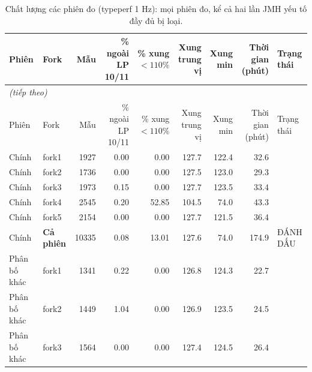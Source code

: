 \footnotesize
\begin{longtable}{llrrrrrrl}
\caption{Chất lượng các phiên đo (typeperf 1 Hz): mọi phiên đo, kể cả hai lần JMH yếu tố đầy đủ bị loại.}\label{tab:session_quality}\\
\toprule
Phiên & Fork & Mẫu & \makecell{{\% ngoài} \\ {LP 10/11}} & \makecell{{\% xung} \\ {$<110\%$}} & \makecell{{Xung} \\ {trung vị}} & \makecell{{Xung} \\ {min}} & \makecell{{Thời gian} \\ {(phút)}} & Trạng thái \\
\midrule
\endfirsthead
\multicolumn{9}{l}{\textit{(tiếp theo)}}\\
\toprule
Phiên & Fork & Mẫu & \makecell{{\% ngoài} \\ {LP 10/11}} & \makecell{{\% xung} \\ {$<110\%$}} & \makecell{{Xung} \\ {trung vị}} & \makecell{{Xung} \\ {min}} & \makecell{{Thời gian} \\ {(phút)}} & Trạng thái \\
\midrule
\endhead
\bottomrule
\endlastfoot
Chính & fork1 & \num{1927} & 0.00 & 0.00 & 127.7 & 122.4 & 32.6 &  \\
Chính & fork2 & \num{1736} & 0.00 & 0.00 & 127.5 & 123.0 & 29.3 &  \\
Chính & fork3 & \num{1973} & 0.15 & 0.00 & 127.7 & 123.5 & 33.4 &  \\
Chính & fork4 & \num{2545} & 0.20 & 52.85 & 104.5 & 74.0 & 43.3 &  \\
Chính & fork5 & \num{2154} & 0.00 & 0.00 & 127.7 & 121.5 & 36.4 &  \\
Chính & \textbf{Cả phiên} & \num{10335} & 0.08 & 13.01 & 127.6 & 74.0 & 174.9 & ĐÁNH DẤU \\
Phân bố khác & fork1 & \num{1341} & 0.22 & 0.00 & 126.8 & 124.3 & 22.7 &  \\
Phân bố khác & fork2 & \num{1449} & 1.04 & 0.00 & 126.9 & 123.5 & 24.5 &  \\
Phân bố khác & fork3 & \num{1564} & 0.00 & 0.00 & 127.4 & 124.5 & 26.4 &  \\

\end{longtable}
